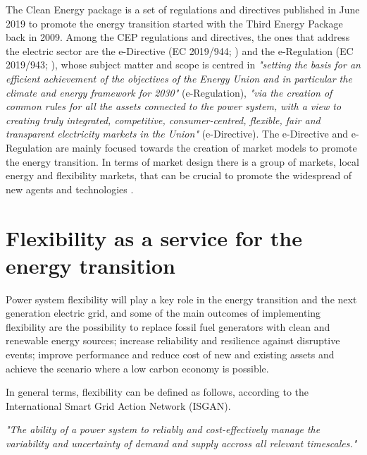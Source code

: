 The Clean Energy package is a set of regulations and directives published in June 2019 to promote the energy transition started with the Third Energy Package back in 2009. Among the CEP regulations and directives, the ones that address the electric sector are the e-Directive (EC 2019/944; \cite{Directive2019944}) and the e-Regulation (EC 2019/943; \cite{Directive2019943}), whose subject matter and scope is centred in \textit{"setting the basis for an efficient achievement of the objectives of the Energy Union and in particular the climate and energy framework for 2030"} (e-Regulation), \textit{"via the creation of common rules for all the assets connected to the power system, with a view to creating truly integrated, competitive, consumer-centred, flexible, fair and transparent electricity markets in the Union"} (e-Directive). The e-Directive and e-Regulation are mainly focused towards the creation of market models to
promote the energy transition. In terms of market design there is a group of markets, local energy and flexibility markets, that can be crucial to promote the widespread of new agents and technologies \cite{Xu2019}.


\section{Flexibility as a service for the energy transition}
Power system flexibility will play a key role in the energy transition and the next generation electric grid, and some of the main outcomes of implementing flexibility are the possibility to replace fossil fuel generators with clean and renewable energy sources; increase reliability and resilience against disruptive events; improve performance and reduce cost of new and existing assets and achieve the scenario where a low carbon economy is possible. 

In general terms, flexibility can be defined as follows, according to the International Smart Grid Action Network (ISGAN)\cite{Hillberg2019}.
\vspace*{3mm}
\begin{tcolorbox}
\textit{"The ability of a power system to reliably and cost-effectively manage the variability and uncertainty of demand and supply accross all relevant timescales."}
\end{tcolorbox} 
\vspace*{3mm}

